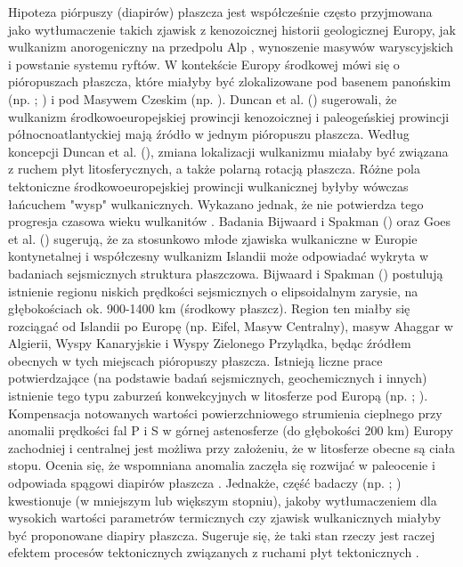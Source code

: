 \documentclass[11.5pt,twoside]{report}
\begin{document}
Hipoteza piórpuszy (diapirów) płaszcza jest współcześnie często przyjmowana jako wytłumaczenie takich zjawisk z kenozoicznej historii geologicznej Europy, jak wulkanizm anorogeniczny na przedpolu Alp \parencite{Wilson.2001}, wynoszenie masywów waryscyjskich i powstanie systemu ryftów. W kontekście Europy środkowej mówi się o pióropuszach płaszcza, które miałyby być zlokalizowane pod basenem panońskim (np. \cite{Seghedi.2004}; \cite{Konecny.2002}) i pod Masywem Czeskim (np. \cite{Wilson.2001}). Duncan et al. (\citeyear{Duncan.1972}) sugerowali, że wulkanizm środkowoeuropejskiej prowincji kenozoicznej i paleogeńskiej prowincji północnoatlantyckiej mają \'{z}ródło w jednym pióropuszu płaszcza. Według koncepcji Duncan et al. (\citeyear{Duncan.1972}), zmiana lokalizacji wulkanizmu miałaby być związana z ruchem płyt litosferycznych, a także polarną rotacją płaszcza. Różne pola tektoniczne środkowoeuropejskiej prowincji wulkanicznej byłyby wówczas łańcuchem "wysp" wulkanicznych. Wykazano jednak, że nie potwierdza tego progresja czasowa wieku wulkanitów \parencite{Ritter.2001}. Badania Bijwaard i Spakman (\citeyear{Bijwaard.1999}) oraz Goes et al. (\citeyear{Goes.1999}) sugerują, że za stosunkowo młode zjawiska wulkaniczne w Europie kontynetalnej i współczesny wulkanizm Islandii może odpowiadać wykryta w badaniach sejsmicznych struktura płaszczowa. Bijwaard i Spakman (\citeyear{Bijwaard.1999}) postulują istnienie regionu niskich prędkości sejsmicznych o elipsoidalnym zarysie, na głębokościach ok. 900-1400 km (środkowy płaszcz). Region ten miałby się rozciągać od Islandii po Europę (np. Eifel, Masyw Centralny), masyw Ahaggar w Algierii, Wyspy Kanaryjskie i Wyspy Zielonego Przylądka, będąc \'{z}ródłem obecnych w tych miejscach pióropuszy płaszcza. Istnieją liczne prace potwierdzające (na podstawie badań sejsmicznych, geochemicznych i innych) istnienie tego typu zaburzeń konwekcyjnych w litosferze pod Europą (np. \cite{Ritter.2001}; \cite{Granet.1995}). Kompensacja notowanych wartości powierzchniowego strumienia cieplnego przy anomalii prędkości fal P i S w górnej astenosferze (do głębokości 200 km) Europy zachodniej i centralnej jest możliwa przy założeniu, że w litosferze obecne są ciała stopu. Ocenia się, że wspomniana anomalia zaczęła się rozwijać w paleocenie i odpowiada spągowi diapirów płaszcza \parencite{Dezes.2004}. Jednakże, część badaczy (np. \cite{Harangi.2007}; \cite{Plomerova.2007}) kwestionuje (w mniejszym lub większym stopniu), jakoby wytłumaczeniem dla wysokich wartości parametrów termicznych czy zjawisk wulkanicznych miałyby być proponowane diapiry płaszcza. Sugeruje się, że taki stan rzeczy jest raczej efektem procesów tektonicznych związanych z ruchami płyt tektonicznych \parencite{Harangi.2007}. 
\end{document}
